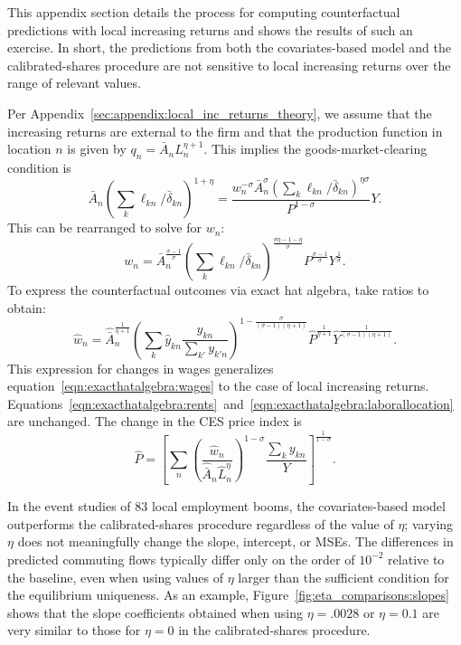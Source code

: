 \documentclass[11pt]{article}
\theoremstyle{definition}
\begin{document}
This appendix section details the process for computing counterfactual predictions with 
local increasing returns and shows the results of such an exercise.
In short, the predictions from both the covariates-based model and the calibrated-shares procedure
are not sensitive to local increasing returns over the range of relevant values.

Per Appendix~\ref{sec:appendix:local_inc_returns_theory},
we assume that the increasing returns are
external to the firm and that the production function in location $n$ is given by \(q_n = \bar{A}_n L_n^{\eta + 1}\). 
This implies the goods-market-clearing condition is
\begin{equation*}
\bar{A}_n \left( \sum_k \ell_{kn}/\bar{\delta}_{kn}\right)^{1 + \eta} = 
        \frac{w_n^{-\sigma}\bar{A}_n^\sigma\left(\sum_k \ell_{kn} / \bar{\delta}_{kn}\right)^{\eta \sigma}}{P^{1-\sigma}}Y
.\end{equation*}
This can be rearranged to solve for $w_{n}$:
\begin{equation*}
w_n = \bar{A}_n^{\frac{\sigma - 1}{\sigma}} 
            \left(
                \sum_k \ell_{kn}/\bar{\delta}_{kn}
            \right) ^ \frac{\sigma \eta - 1 - \eta}{\sigma} 
            P^{\frac{\sigma - 1}{\sigma}}Y^{\frac{1}{\sigma}}
.\end{equation*}
To express the counterfactual outcomes via exact hat algebra, take ratios to obtain:
\[
    \hat{w}_n = \hat{\bar{A}}_n^{\frac{1}{\eta + 1}}
    \left(\sum_k \hat{y}_{kn} \frac{y_{kn}}{\sum_{k'} y_{k'n}}\right) ^  
          {1 - \frac{\sigma}{(\sigma - 1)(\eta + 1)}}
    \hat{P} ^ \frac{1}{\eta + 1} \hat{Y} ^ \frac{1}{(\sigma - 1)(\eta + 1)}
.\]
This expression for changes in wages generalizes equation~\eqref{eqn:exacthatalgebra:wages} 
to the case of local increasing returns.
Equations~\eqref{eqn:exacthatalgebra:rents}~and~\eqref{eqn:exacthatalgebra:laborallocation}
are unchanged.
The change in the CES price index 
is
\begin{equation*}
\hat{P} = \left[
  \sum_n 
  \left(\frac{\hat{w}_n}{\hat{\bar{A}}_n \hat{L}^\eta_n}\right)^{1 - \sigma}
  \frac{\sum_k y_{kn}}{Y}
  \right] ^ \frac{1}{1 - \sigma}
.\end{equation*}

\enlargethispage{\baselineskip}
In the event studies of 83 local employment booms, 
the covariates-based model outperforms the calibrated-shares procedure regardless of the value of $\eta$; 
varying $\eta$ does not meaningfully change the slope, intercept, or MSEs.
The differences in predicted commuting flows typically differ only on the order of
\(10^{-2}\) relative to the baseline, even when using values of \(\eta\) larger than 
the sufficient condition for the equilibrium uniqueness.
As an example, 
Figure~\ref{fig:eta_comparisons:slopes} shows that the slope coefficients obtained
when using $\eta = .0028$ or $\eta = 0.1$ are very similar to those for $\eta = 0$ in the calibrated-shares procedure.
\end{document}
